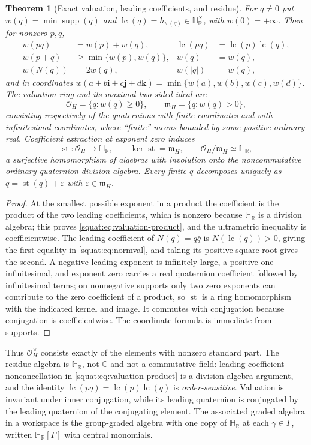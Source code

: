 \documentclass[11pt,letterpaper]{article}
\numberwithin{equation}{section}
\newtheorem{theorem}{Theorem}[section]
\theoremstyle{definition}
\theoremstyle{remark}
\newcommand{\HR}{\mathbb H_{\mathbb R}}
\newcommand{\C}{\mathbb C}
\newcommand{\OO}{\mathcal O}
\newcommand{\mm}{\mathfrak m}
\newcommand{\eps}{\varepsilon}
\newcommand{\ii}{\mathbf i}
\newcommand{\jj}{\mathbf j}
\newcommand{\kk}{\mathbf k}
\newcommand{\st}{\operatorname{st}}
\newcommand{\supp}{\operatorname{supp}}
\newcommand{\lc}{\operatorname{lc}}
\newcommand{\abs}[1]{\left|#1\right|}
\begin{document}
\begin{theorem}[Exact valuation, leading coefficients, and residue]\label{squat:thm:valuation}
For $q\ne0$ put $w(q)=\min\supp(q)$ and $\lc(q)=h_{w(q)}\in\HR^\times$, with
$w(0)=+\infty$. Then for nonzero $p,q$,
\begin{align}
 w(pq)&=w(p)+w(q), &\lc(pq)&=\lc(p)\lc(q),\label{squat:eq:valuation-product}\\
 w(p+q)&\ge\min\{w(p),w(q)\}, &w(\bar q)&=w(q),\\
 w(N(q))&=2w(q), &w(\abs q)&=w(q),\label{squat:eq:normval}
\end{align}
and in coordinates $w(a+b\ii+c\jj+d\kk)=\min\{w(a),w(b),w(c),w(d)\}$. The valuation ring
and its maximal \emph{two-sided} ideal are
\[
 \OO_H=\{q:w(q)\ge0\},\qquad \mm_H=\{q:w(q)>0\},
\]
consisting respectively of the quaternions with finite coordinates and with infinitesimal
coordinates, where ``finite'' means bounded by some positive ordinary real. Coefficient
extraction at exponent zero induces
\begin{equation}\label{squat:eq:residue}
 \st:\OO_H\longrightarrow\HR,\qquad \ker\st=\mm_H,\qquad
 \OO_H/\mm_H\simeq\HR,
\end{equation}
a surjective homomorphism of algebras with involution onto the \emph{noncommutative}
ordinary quaternion division algebra. Every finite $q$ decomposes uniquely as
$q=\st(q)+\eps$ with $\eps\in\mm_H$.
\end{theorem}
\begin{proof}
At the smallest possible exponent in a product the coefficient is the product of the two
leading coefficients, which is nonzero because $\HR$ is a division algebra; this proves
\cref{squat:eq:valuation-product}, and the ultrametric inequality is coefficientwise. The
leading coefficient of $N(q)=q\bar q$ is $N(\lc(q))>0$, giving the first equality in
\cref{squat:eq:normval}, and taking its positive square root gives the second. A negative
leading exponent is infinitely large, a positive one infinitesimal, and exponent zero
carries a real quaternion coefficient followed by infinitesimal terms; on nonnegative
supports only two zero exponents can contribute to the zero coefficient of a product, so
$\st$ is a ring homomorphism with the indicated kernel and image. It commutes with
conjugation because conjugation is coefficientwise. The coordinate formula is immediate
from supports.
\end{proof}

Thus $\OO_H^\times$ consists exactly of the elements with nonzero standard part. The
residue algebra is $\HR$, not $\C$ and not a commutative field: leading-coefficient
noncancellation in \cref{squat:eq:valuation-product} is a division-algebra argument, and
the identity $\lc(pq)=\lc(p)\lc(q)$ is \emph{order-sensitive}. Valuation is invariant
under inner conjugation, while its leading quaternion is conjugated by the leading
quaternion of the conjugating element. The associated graded algebra in a workspace is the
group-graded algebra with one copy of $\HR$ at each $\gamma\in\Gamma$, written
$\HR[\Gamma]$ with central monomials.
\end{document}
